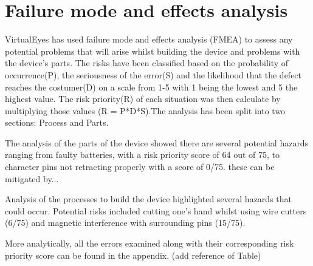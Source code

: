 \section{Failure mode and effects analysis}
VirtualEyes has used failure mode and effects analysis (FMEA) to assess any potential problems that will arise whilst building the device and problems with the device's parts. The risks have been classified based on the probability of occurrence(P), the seriousness of the error(S) and the likelihood that the defect reaches the costumer(D) on a scale from 1-5 with 1 being the lowest and 5 the highest value. The risk priority(R) of each situation was then calculate by multiplying those values (R = P*D*S).The analysis has been split into two sections: Process and Parts. 

The analysis of the parts of the device showed there are several potential hazards ranging from faulty batteries, with a risk priority score of 64 out of 75, to character pins not retracting properly with a score of 0/75. these can be mitigated by... 

Analysis of the processes to build the device highlighted several hazards that could occur. Potential risks included cutting one's hand whilst using wire cutters (6/75) and magnetic interference with surrounding pins (15/75).

More analytically, all the errors examined along with their corresponding risk priority score can be found in the appendix. (add reference of Table)
